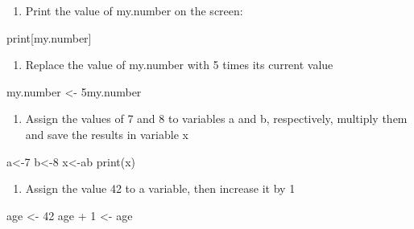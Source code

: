 \documentclass[
  letterpaper,
  DIV=11,
  numbers=noendperiod]{scrreprt}
\newenvironment{Shaded}{\begin{snugshade}}{\end{snugshade}}
\newcommand{\DecValTok}[1]{\textcolor[rgb]{0.68,0.00,0.00}{#1}}
\newcommand{\FunctionTok}[1]{\textcolor[rgb]{0.28,0.35,0.67}{#1}}
\newcommand{\NormalTok}[1]{\textcolor[rgb]{0.00,0.23,0.31}{#1}}
\newcommand{\OtherTok}[1]{\textcolor[rgb]{0.00,0.23,0.31}{#1}}
\newcommand{\SpecialCharTok}[1]{\textcolor[rgb]{0.37,0.37,0.37}{#1}}
\providecommand{\tightlist}{%
  \setlength{\itemsep}{0pt}\setlength{\parskip}{0pt}}\usepackage{longtable,booktabs,array}
\begin{document}
\begin{enumerate}
\def\labelenumi{\arabic{enumi}.}
\setcounter{enumi}{4}
\tightlist
\item
  Print the value of my.number on the screen:
\end{enumerate}

\begin{Shaded}
\begin{Highlighting}[]
\NormalTok{print[my.number]}
\end{Highlighting}
\end{Shaded}

\begin{enumerate}
\def\labelenumi{\arabic{enumi}.}
\setcounter{enumi}{5}
\tightlist
\item
  Replace the value of my.number with 5 times its current value
\end{enumerate}

\begin{Shaded}
\begin{Highlighting}[]
\NormalTok{my.number }\OtherTok{\textless{}{-}}\NormalTok{ 5my.number }
\end{Highlighting}
\end{Shaded}

\begin{enumerate}
\def\labelenumi{\arabic{enumi}.}
\setcounter{enumi}{6}
\tightlist
\item
  Assign the values of 7 and 8 to variables a and b, respectively,
  multiply them and save the results in variable x
\end{enumerate}

\begin{Shaded}
\begin{Highlighting}[]
\NormalTok{a}\OtherTok{\textless{}{-}}\DecValTok{7}
\NormalTok{b}\OtherTok{\textless{}{-}}\DecValTok{8}
\NormalTok{x}\OtherTok{\textless{}{-}}\NormalTok{ab}
\FunctionTok{print}\NormalTok{(x)}
\end{Highlighting}
\end{Shaded}

\begin{enumerate}
\def\labelenumi{\arabic{enumi}.}
\setcounter{enumi}{8}
\tightlist
\item
  Assign the value 42 to a variable, then increase it by 1
\end{enumerate}

\begin{Shaded}
\begin{Highlighting}[]
\NormalTok{age }\OtherTok{\textless{}{-}} \DecValTok{42}
\NormalTok{age }\SpecialCharTok{+} \DecValTok{1} \OtherTok{\textless{}{-}}\NormalTok{ age}
\end{Highlighting}
\end{Shaded}
\end{document}
